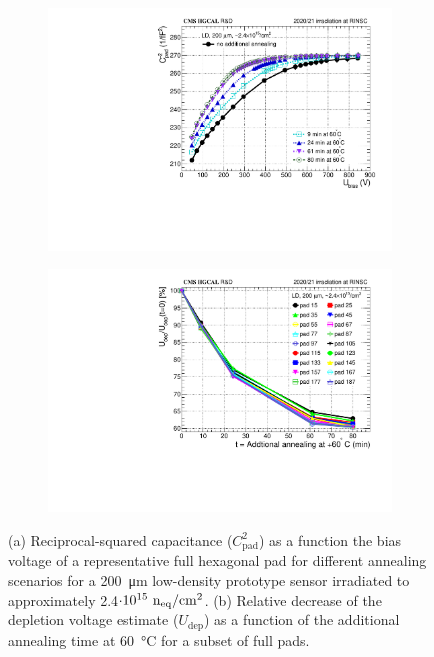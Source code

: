 \begin{figure}
	\captionsetup[subfigure]{aboveskip=-1pt,belowskip=-1pt}
	\centering

	\begin{subfigure}[b]{0.49\textwidth}
		\includegraphics[width=0.999\textwidth]{plots/annealing_Vdep/annealing_CV_ch24.pdf}
		\subcaption{
		}
        \label{plot:annealing_CV}
	\end{subfigure}
    \hfill
    \begin{subfigure}[b]{0.49\textwidth}
		\includegraphics[width=0.999\textwidth]{plots/annealing_Vdep/annealing_Vdep.pdf}
		\subcaption{
		}		
        \label{plot:annealing_Vdep}
	\end{subfigure}
	\caption{
        (a) Reciprocal-squared capacitance ($C^2_\text{pad}$) as a function the bias voltage of a representative full hexagonal pad for different annealing scenarios for a \SI{200}{\micro\metre} low-density prototype sensor irradiated to approximately 2.4$\cdot 10^{15}~\mathrm{n_{eq}}/\mathrm{cm}^{2}$.   
		(b) Relative decrease of the depletion voltage estimate ($U_\text{dep}$) as a function of the additional annealing time at \SI{60}{\celsius} for a subset of full pads.
	}
\end{figure}
